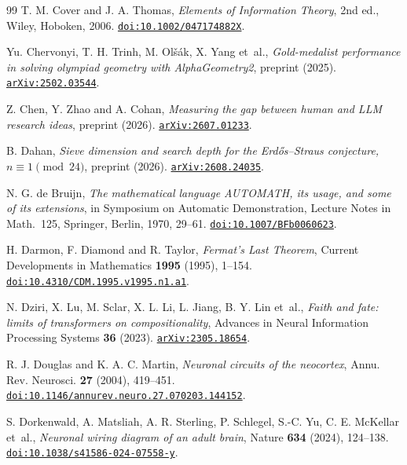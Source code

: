 \begin{thebibliography}{99}
T. M. Cover and J. A. Thomas,
\emph{Elements of Information Theory}, 2nd ed.,
Wiley, Hoboken, 2006.
\href{https://doi.org/10.1002/047174882X}{\nolinkurl{doi:10.1002/047174882X}}.

Yu. Chervonyi, T. H. Trinh, M. Ol\v{s}\'ak, X. Yang et~al.,
\emph{Gold-medalist performance in solving olympiad geometry with AlphaGeometry2},
preprint (2025).
\href{https://arxiv.org/abs/2502.03544}{\nolinkurl{arXiv:2502.03544}}.

Z. Chen, Y. Zhao and A. Cohan,
\emph{Measuring the gap between human and LLM research ideas},
preprint (2026).
\href{https://arxiv.org/abs/2607.01233}{\nolinkurl{arXiv:2607.01233}}.

B. Dahan,
\emph{Sieve dimension and search depth for the Erd\H{o}s--Straus conjecture, $n\equiv1\pmod{24}$},
preprint (2026).
\href{https://arxiv.org/abs/2608.24035}{\nolinkurl{arXiv:2608.24035}}.

N. G. de Bruijn,
\emph{The mathematical language AUTOMATH, its usage, and some of its extensions},
in Symposium on Automatic Demonstration, Lecture Notes in Math.~125, Springer, Berlin, 1970, 29--61.
\href{https://doi.org/10.1007/BFb0060623}{\nolinkurl{doi:10.1007/BFb0060623}}.

H. Darmon, F. Diamond and R. Taylor,
\emph{Fermat's Last Theorem},
Current Developments in Mathematics \textbf{1995} (1995), 1--154.
\href{https://doi.org/10.4310/CDM.1995.v1995.n1.a1}{\nolinkurl{doi:10.4310/CDM.1995.v1995.n1.a1}}.

N. Dziri, X. Lu, M. Sclar, X. L. Li, L. Jiang, B. Y. Lin et~al.,
\emph{Faith and fate: limits of transformers on compositionality},
Advances in Neural Information Processing Systems \textbf{36} (2023).
\href{https://arxiv.org/abs/2305.18654}{\nolinkurl{arXiv:2305.18654}}.

R. J. Douglas and K. A. C. Martin,
\emph{Neuronal circuits of the neocortex},
Annu. Rev. Neurosci. \textbf{27} (2004), 419--451.
\href{https://doi.org/10.1146/annurev.neuro.27.070203.144152}{\nolinkurl{doi:10.1146/annurev.neuro.27.070203.144152}}.

S. Dorkenwald, A. Matsliah, A. R. Sterling, P. Schlegel, S.-C. Yu, C. E. McKellar et~al.,
\emph{Neuronal wiring diagram of an adult brain},
Nature \textbf{634} (2024), 124--138.
\href{https://doi.org/10.1038/s41586-024-07558-y}{\nolinkurl{doi:10.1038/s41586-024-07558-y}}.


\end{thebibliography}
